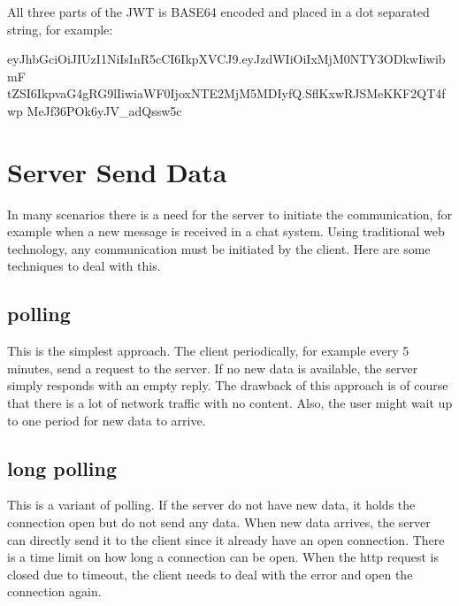 All three parts of the JWT is BASE64 encoded and placed in a dot separated string, for example:
\begin{Code}
eyJhbGciOiJIUzI1NiIsInR5cCI6IkpXVCJ9.eyJzdWIiOiIxMjM0NTY3ODkwIiwibmF
tZSI6IkpvaG4gRG9lIiwiaWF0IjoxNTE2MjM5MDIyfQ.SflKxwRJSMeKKF2QT4fwp
MeJf36POk6yJV_adQssw5c
\end{Code}

\chapter{Server Send Data} \label{chapter:server:push}
In many scenarios there is a need for the server to initiate  the communication, for example when a new message is received in a chat system. Using traditional web technology, any communication must be initiated by the client. Here are some techniques to deal with this.
\section{polling}
This is the simplest approach. The client periodically, for example every 5 minutes, send a request to the server. If no new data is available, the server simply responds with an empty reply. The drawback of this approach is of course that there is a lot of network traffic with no content. Also, the user might wait up to one period for new data to arrive.
\section{long polling}
This is a variant of polling. If the server do not have new data, it holds the connection open but do not send any data. When new data arrives, the server can directly send it to the client since it already have an open connection. There is a time limit on how long a connection can be open. When the http request is closed due to timeout, the client needs to deal with the error and open the connection again.
